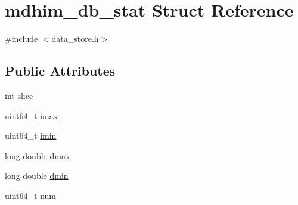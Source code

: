 \hypertarget{structmdhim__db__stat}{\section{mdhim\-\_\-db\-\_\-stat Struct Reference}
\label{structmdhim__db__stat}
}


{\ttfamily \#include $<$data\-\_\-store.\-h$>$}

\subsection*{Public Attributes}
\begin{DoxyCompactItemize}
\item 
int \hyperlink{structmdhim__db__stat_af69e251abcde91c5441f7a55c408ab55}{slice}
\item 
uint64\-\_\-t \hyperlink{structmdhim__db__stat_a58ff0fbdb99c6f23d7cb8945c2f9b6e0}{imax}
\item 
uint64\-\_\-t \hyperlink{structmdhim__db__stat_a76f68ccd3a2fabdd949512ab7bcacd5d}{imin}
\item 
long double \hyperlink{structmdhim__db__stat_a1ccd0e75db4b05ea4ef48b2e36c757f5}{dmax}
\item 
long double \hyperlink{structmdhim__db__stat_ac1f4a8cb1a2a1c567245bc5b8ecfdc05}{dmin}
\item 
uint64\-\_\-t \hyperlink{structmdhim__db__stat_a362426563ec5fbc354dfdbf31e68d691}{num}
\end{DoxyCompactItemize}


